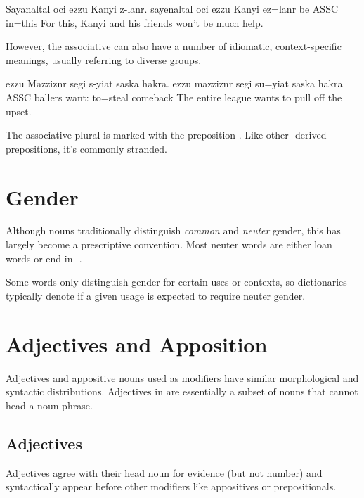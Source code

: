 \begin{example} \label{ex:ezzu_basic}
    \script Sayanaltal oci ezzu Kanyi z-lanr.
    \bits sayenaltal oci ezzu Kanyi ez=lanr
     be ASSC  in=this
    \tr For this, Kanyi and his friends won't be much help.
\end{example}

However, the associative can also have a number of idiomatic, context-specific meanings, usually referring to diverse groups.

\begin{example} \label{ex:ezzu_idiom}
    \script ezzu Mazziznr segi s-yiat saska hakra.
    \bits ezzu mazziznr segi su=yiat {saska hakra}
    \gloss ASSC ballers want: to=steal comeback
    \tr The entire league wants to pull off the upset.
\end{example}

The associative plural is marked with the preposition . Like other -derived prepositions, it's commonly stranded.

\section{Gender}
Although nouns traditionally distinguish \emph{common} and \emph{neuter} gender, this has largely become a prescriptive convention.  Most neuter words are either loan words or end in -.

Some words only distinguish gender for certain uses or contexts, so dictionaries typically denote if a given usage is expected to require neuter gender.

\section{Adjectives and Apposition}
Adjectives and appositive nouns used as modifiers have similar morphological and syntactic distributions. Adjectives in \langname{} are essentially a subset of nouns that cannot head a noun phrase.

\subsection{Adjectives}
Adjectives agree with their head noun for evidence (but not number) and syntactically appear before other modifiers like appositives or prepositionals.

